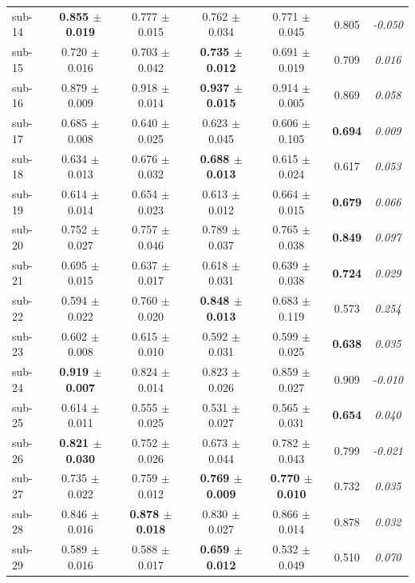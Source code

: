 \begin{table}[t]
\begin{tabular}{lcccccc}
sub-14 & \textbf{0.855 $\pm$ 0.019} & 0.777 $\pm$ 0.015 & 0.762 $\pm$ 0.034 & 0.771 $\pm$ 0.045 & 0.805 & \textit{-0.050} \\
sub-15 & 0.720 $\pm$ 0.016 & 0.703 $\pm$ 0.042 & \textbf{0.735 $\pm$ 0.012} & 0.691 $\pm$ 0.019 & 0.709 & \textit{0.016} \\
sub-16 & 0.879 $\pm$ 0.009 & 0.918 $\pm$ 0.014 & \textbf{0.937 $\pm$ 0.015} & 0.914 $\pm$ 0.005 & 0.869 & \textit{0.058} \\
sub-17 & 0.685 $\pm$ 0.008 & 0.640 $\pm$ 0.025 & 0.623 $\pm$ 0.045 & 0.606 $\pm$ 0.105 & \textbf{0.694} & \textit{0.009} \\
sub-18 & 0.634 $\pm$ 0.013 & 0.676 $\pm$ 0.032 & \textbf{0.688 $\pm$ 0.013} & 0.615 $\pm$ 0.024 & 0.617 & \textit{0.053} \\
sub-19 & 0.614 $\pm$ 0.014 & 0.654 $\pm$ 0.023 & 0.613 $\pm$ 0.012 & 0.664 $\pm$ 0.015 & \textbf{0.679} & \textit{0.066} \\
sub-20 & 0.752 $\pm$ 0.027 & 0.757 $\pm$ 0.046 & 0.789 $\pm$ 0.037 & 0.765 $\pm$ 0.038 & \textbf{0.849} & \textit{0.097} \\
sub-21 & 0.695 $\pm$ 0.015 & 0.637 $\pm$ 0.017 & 0.618 $\pm$ 0.031 & 0.639 $\pm$ 0.038 & \textbf{0.724} & \textit{0.029} \\
sub-22 & 0.594 $\pm$ 0.022 & 0.760 $\pm$ 0.020 & \textbf{0.848 $\pm$ 0.013} & 0.683 $\pm$ 0.119 & 0.573 & \textit{0.254} \\
sub-23 & 0.602 $\pm$ 0.008 & 0.615 $\pm$ 0.010 & 0.592 $\pm$ 0.031 & 0.599 $\pm$ 0.025 & \textbf{0.638} & \textit{0.035} \\
sub-24 & \textbf{0.919 $\pm$ 0.007} & 0.824 $\pm$ 0.014 & 0.823 $\pm$ 0.026 & 0.859 $\pm$ 0.027 & 0.909 & \textit{-0.010} \\
sub-25 & 0.614 $\pm$ 0.011 & 0.555 $\pm$ 0.025 & 0.531 $\pm$ 0.027 & 0.565 $\pm$ 0.031 & \textbf{0.654} & \textit{0.040} \\
sub-26 & \textbf{0.821 $\pm$ 0.030} & 0.752 $\pm$ 0.026 & 0.673 $\pm$ 0.044 & 0.782 $\pm$ 0.043 & 0.799 & \textit{-0.021} \\
sub-27 & 0.735 $\pm$ 0.022 & 0.759 $\pm$ 0.012 & \textbf{0.769 $\pm$ 0.009} & \textbf{0.770 $\pm$ 0.010} & 0.732 & \textit{0.035} \\
sub-28 & 0.846 $\pm$ 0.016 & \textbf{0.878 $\pm$ 0.018} & 0.830 $\pm$ 0.027 & 0.866 $\pm$ 0.014 & 0.878 & \textit{0.032} \\
sub-29 & 0.589 $\pm$ 0.016 & 0.588 $\pm$ 0.017 & \textbf{0.659 $\pm$ 0.012} & 0.532 $\pm$ 0.049 & 0.510 & \textit{0.070} \\

\end{tabular}
\end{table}
